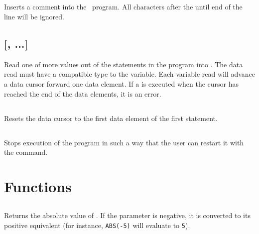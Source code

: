 \documentclass{report}
\begin{document}
    \subsection*{ }

    Inserts a comment into the \BASIC\ program. All characters after the  until
    end of the line will be ignored.

    \subsection*{ [, ...]}

    Read one of more values out of the  statements in the program into
    .
    The data read must have a compatible type to the variable.
    Each variable read will advance a data cursor forward one data element.
    If a  is executed when the cursor has reached the end of the data
    elements, it is an error.

    \subsection*{}

    Resets the data cursor to the first data element of the first  statement.

    \subsection*{}

    Stops execution of the program in such a way that the user can restart it with the
     command.

    \section*{Functions}

    \subsection*{}

    Returns the absolute value of .
    If the parameter is negative, it is converted to its positive equivalent
    (for instance, \verb+ABS(-5)+ will evaluate to \verb+5+).

    \subsection*{}
\end{document}
